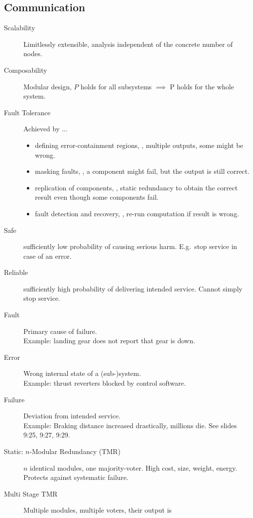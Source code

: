\subsection{Communication}

\begin{description}
    \item[Scalability] Limitlessly extensible, analysis independent of the
    concrete number of nodes.
    \item[Composability] Modular design, $P$ holds for all subsystems $\implies$ 
    P holds for the whole system.
    \item[Fault Tolerance] Achieved by ...
        \begin{itemize}
            \item defining error-containment regions, \ie, multiple outputs,
            some might be wrong.
            \item masking faults, \ie, a component might fail, but the output is
            still correct.
            \item replication of components, \ie, static redundancy to obtain
            the correct result even though some components fail.
            \item fault detection and recovery, \ie, re-run computation if
            result is wrong.
        \end{itemize}
    \item[Safe] sufficiently low probability of causing serious harm. E.g.\ stop
    service in case of an error.
    \item[Reliable] sufficiently high probability of delivering intended
    service. Cannot simply stop service.
    \item[Fault] Primary cause of failure.\\
    Example: landing gear does not report that gear is down.
    \item[Error] Wrong internal state of a (sub-)system. \\
    Example: thrust reverters blocked by control software.
    \item[Failure] Deviation from intended service. \\
    Example: Braking distance increased drastically, millions die. See slides 9:25, 9:27, 9:29.
    \item[Static: $n$-Modular Redundancy (TMR)] $n$ identical modules, one
    majority-voter.
    High cost, size, weight, energy. Protects against systematic failure.
    \item[Multi Stage TMR] Multiple modules, multiple voters, their output is

\end{description}
